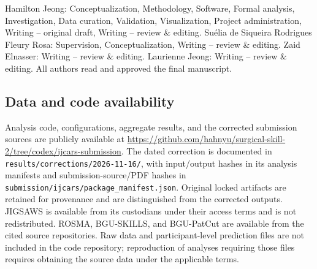 \documentclass[11pt]{article}
\begin{document}
Hamilton Jeong: Conceptualization, Methodology, Software, Formal
analysis, Investigation, Data curation, Validation, Visualization,
Project administration, Writing -- original draft, Writing -- review \&
editing. Suélia de Siqueira Rodrigues Fleury Rosa: Supervision,
Conceptualization, Writing -- review \& editing. Zaid Elnasser: Writing
-- review \& editing. Laurienne Jeong: Writing -- review \& editing. All
authors read and approved the final manuscript.

\subsection{Data and code
availability}\label{data-and-code-availability}

Analysis code, configurations, aggregate results, and the corrected
submission sources are publicly available at
\url{https://github.com/hahnyu/surgical-skill-2/tree/codex/ijcars-submission}.
The dated correction is documented in
\texttt{results/corrections/2026-11-16/}, with input/output hashes in
its analysis manifests and submission-source/PDF hashes in
\texttt{submission/ijcars/package\_manifest.json}. Original locked
artifacts are retained for provenance and are distinguished from the
corrected outputs. JIGSAWS is available from its custodians under their
access terms and is not redistributed. ROSMA, BGU-SKILLS, and BGU-PatCut
are available from the cited source repositories. Raw data and
participant-level prediction files are not included in the code
repository; reproduction of analyses requiring those files requires
obtaining the source data under the applicable terms.



\end{document}
